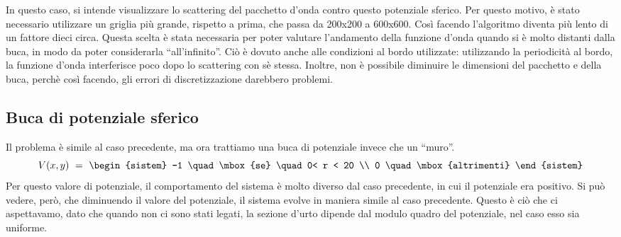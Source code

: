  In questo caso, si intende visualizzare lo scattering del pacchetto d'onda contro questo potenziale sferico.
Per questo motivo, è stato necessario utilizzare un griglia più grande, rispetto a prima,
che passa da 200x200 a 600x600. Così facendo l'algoritmo diventa più lento di un fattore dieci circa.
Questa scelta è stata necessaria per poter
valutare l'andamento della funzione d'onda quando si è molto distanti dalla buca, in modo da poter considerarla ``all'infinito''. 
Ciò è dovuto anche alle condizioni al bordo utilizzate: utilizzando la periodicità al bordo, la funzione d'onda interferisce poco dopo lo scattering
con sè stessa. Inoltre, non è possibile diminuire le dimensioni del pacchetto e della buca, perchè così facendo,
gli errori di discretizzazione darebbero problemi.
\subsection{Buca di potenziale sferico}
Il problema è simile al caso precedente, ma ora trattiamo una buca di potenziale invece che un ``muro''.
$$
V(x,y) \ = \ \begin{sistem}
             -1 \quad \mbox{se} \quad  0< r < 20 \\
              0 \quad \mbox{altrimenti}
             \end{sistem}
$$
Per questo valore di potenziale, il comportamento del sistema è molto diverso dal caso precedente, in cui il potenziale era positivo. Si
può vedere, però, che diminuendo il valore del potenziale, il sistema evolve in maniera simile al caso precedente. Questo è ciò che ci aspettavamo,
dato che quando non ci sono stati legati, la sezione d'urto dipende dal modulo quadro del potenziale, nel caso esso sia uniforme. 


